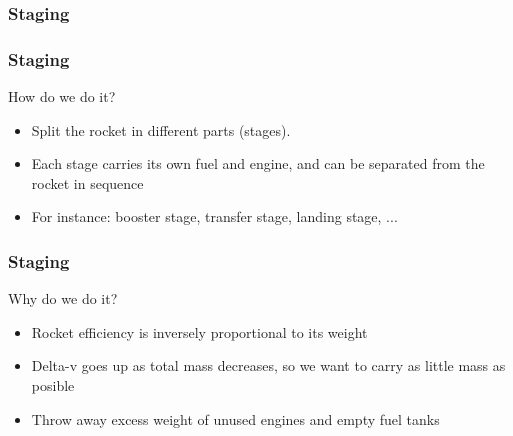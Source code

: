 {
%
\begin{frame}
    \frametitle{Staging}
\end{frame}
\begin{frame}
    \frametitle{Staging}
    \begin{block}{How do we do it?}
        \begin{itemize}
            \item Split the rocket in different parts (stages).
            \item Each stage carries its own fuel and engine, and can be separated from the rocket in sequence
            \item For instance: booster stage, transfer stage, landing stage, ...
        \end{itemize}
    \end{block}
\end{frame}
\begin{frame}
    \frametitle{Staging}
    \begin{block}{Why do we do it?}
        \begin{itemize}
            \item Rocket efficiency is inversely proportional to its weight
            \item Delta-v goes up as total mass decreases, so we want to carry as little mass as posible
            \item Throw away excess weight of unused engines and empty fuel tanks
        \end{itemize}
    \end{block}
\end{frame}
}
